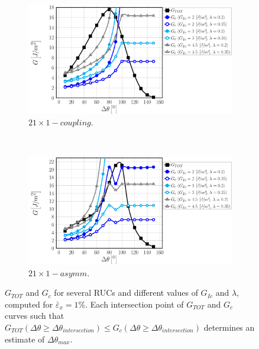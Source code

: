 \begin{figure}[!htbp]
    \begin{subfigure}[b]{0.475\textwidth}
        \includegraphics[width=\textwidth]{paperE/vf60-dsize-S10A0vk.pdf}
        \caption{$21\times 1-coupling$.}\label{paperE:fig:debondsize-g}
    \end{subfigure} ~
    \begin{subfigure}[b]{0.475\textwidth}
        \includegraphics[width=\textwidth]{paperE/vf60-dsize-S10A0asymm.pdf}
        \caption{$21\times 1-asymm$.}\label{paperE:fig:debondsize-h}
    \end{subfigure}

\caption{$G_{TOT}$ and $G_{c}$ for several RUCs and different values of $G_{Ic}$ and $\lambda$, computed for $\bar{\varepsilon}_{x}=1\%$. Each intersection point of $G_{TOT}$ and $G_{c}$ curves such that $G_{TOT}\left(\Delta\theta\geq\Delta\theta_{intersection}\right)\leq G_{c}\left(\Delta\theta\geq\Delta\theta_{intersection}\right)$ determines an estimate of $\Delta\theta_{max}$.}\label{paperE:fig:debondsize}
\end{figure}


